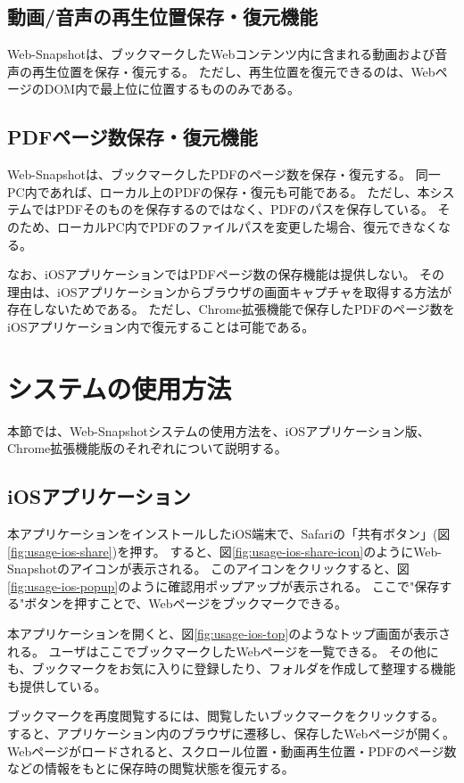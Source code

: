\subsection{動画/音声の再生位置保存・復元機能}
Web-Snapshotは、ブックマークしたWebコンテンツ内に含まれる動画および音声の再生位置を保存・復元する。
ただし、再生位置を復元できるのは、WebページのDOM内で最上位に位置するもののみである。

\subsection{PDFページ数保存・復元機能}
Web-Snapshotは、ブックマークしたPDFのページ数を保存・復元する。
同一PC内であれば、ローカル上のPDFの保存・復元も可能である。
ただし、本システムではPDFそのものを保存するのではなく、PDFのパスを保存している。
そのため、ローカルPC内でPDFのファイルパスを変更した場合、復元できなくなる。

なお、iOSアプリケーションではPDFページ数の保存機能は提供しない。
その理由は、iOSアプリケーションからブラウザの画面キャプチャを取得する方法が存在しないためである。
ただし、Chrome拡張機能で保存したPDFのページ数をiOSアプリケーション内で復元することは可能である。

\section{システムの使用方法}
本節では、Web-Snapshotシステムの使用方法を、iOSアプリケーション版、Chrome拡張機能版のそれぞれについて説明する。

\subsection{iOSアプリケーション}
本アプリケーションをインストールしたiOS端末で、Safariの「共有ボタン」(図\ref{fig:usage-ios-share})を押す。
すると、図\ref{fig:usage-ios-share-icon}のようにWeb-Snapshotのアイコンが表示される。
このアイコンをクリックすると、図\ref{fig:usage-ios-popup}のように確認用ポップアップが表示される。
ここで"保存する"ボタンを押すことで、Webページをブックマークできる。

本アプリケーションを開くと、図\ref{fig:usage-ios-top}のようなトップ画面が表示される。
ユーザはここでブックマークしたWebページを一覧できる。
その他にも、ブックマークをお気に入りに登録したり、フォルダを作成して整理する機能も提供している。

ブックマークを再度閲覧するには、閲覧したいブックマークをクリックする。
すると、アプリケーション内のブラウザに遷移し、保存したWebページが開く。
Webページがロードされると、スクロール位置・動画再生位置・PDFのページ数などの情報をもとに保存時の閲覧状態を復元する。

